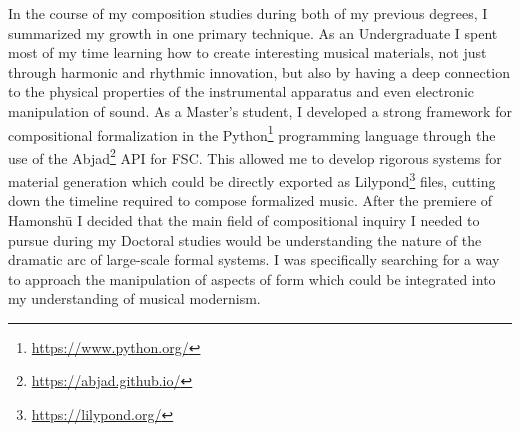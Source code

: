 In the course of my composition studies during both of my previous degrees, I summarized my growth in one primary technique. As an Undergraduate I spent most of my time learning how to create interesting musical materials, not just through harmonic and rhythmic innovation, but also by having a deep connection to the physical properties of the instrumental apparatus and even electronic manipulation of sound. As a Master's student, I developed a strong framework for compositional formalization in the Python\footnote{\url{https://www.python.org/}} programming language through the use of the Abjad\footnote{\url{https://abjad.github.io/}} \ac{API} for \ac{FSC}. This allowed me to develop rigorous systems for material generation which could be directly exported as Lilypond\footnote{\url{https://lilypond.org/}} files, cutting down the timeline required to compose formalized music. After the premiere of Hamonshū I decided that the main field of compositional inquiry I needed to pursue during my Doctoral studies would be understanding the nature of the dramatic arc of large-scale formal systems. I was specifically searching for a way to approach the manipulation of aspects of form which could be integrated into my understanding of musical modernism.

